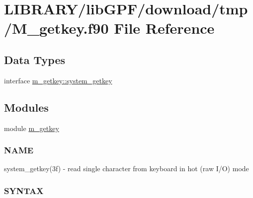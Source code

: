 \hypertarget{M__getkey_8f90}{}\section{L\+I\+B\+R\+A\+R\+Y/lib\+G\+P\+F/download/tmp/\+M\+\_\+getkey.f90 File Reference}
\label{M__getkey_8f90}
\subsection*{Data Types}
\begin{DoxyCompactItemize}
\item 
interface \hyperlink{interfacem__getkey_1_1system__getkey}{m\+\_\+getkey\+::system\+\_\+getkey}
\end{DoxyCompactItemize}
\subsection*{Modules}
\begin{DoxyCompactItemize}
\item 
module \hyperlink{namespacem__getkey}{m\+\_\+getkey}
\begin{DoxyCompactList}\small\item\em \subsubsection*{N\+A\+ME}

system\+\_\+getkey(3f) -\/ read single character from keyboard in hot (raw I/O) mode \subsubsection*{S\+Y\+N\+T\+AX}\end{DoxyCompactList}\end{DoxyCompactItemize}
